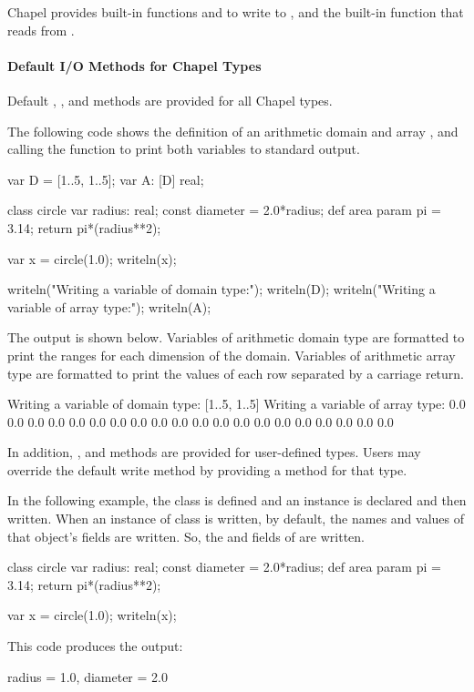 Chapel provides built-in functions  and 
to write to , and the built-in function 
that reads from .

\paragraph{Default I/O Methods for Chapel Types}
Default , , and  methods are 
provided for all Chapel types.  

\begin{example}
The following code shows the definition of an arithmetic domain 
and array , and calling the  function
to print both variables to standard output.  
\begin{chapel}
var D = [1..5, 1..5];
var A: [D] real;

class circle {
  var radius: real;
  const diameter = 2.0*radius;
  def area {
    param pi = 3.14;
    return pi*(radius**2);
  }
}

var x = circle(1.0);
writeln(x);

writeln("Writing a variable of domain type:");
writeln(D);
writeln("Writing a variable of array type:");
writeln(A);
\end{chapel}

The output is shown below.  Variables of arithmetic domain type are 
formatted to print the ranges for each dimension of the domain.  Variables
of arithmetic array type are formatted to print the values of each row
separated by a carriage return.
\begin{commandline}
Writing a variable of domain type:
[1..5, 1..5]
Writing a variable of array type:
0.0 0.0 0.0 0.0 0.0
0.0 0.0 0.0 0.0 0.0
0.0 0.0 0.0 0.0 0.0
0.0 0.0 0.0 0.0 0.0
\end{commandline}
\end{example}

In addition, ,  and  methods
are provided for user-defined types.  Users may override the default
write method by providing a  method
for that type.

\begin{example}
In the following example, the class  is defined and
an instance  is declared and then written.
When an instance of class is written, by default, the names and values 
of that object's fields are written.  So, the  and
 fields of  are written.

\begin{chapel}
class circle {
  var radius: real;
  const diameter = 2.0*radius;
  def area {
    param pi = 3.14;
    return pi*(radius**2);
  }
}

var x = circle(1.0);
writeln(x);
\end{chapel}

This code produces the output:
\begin{commandline}
{radius = 1.0, diameter = 2.0}
\end{commandline}
\end{example}


